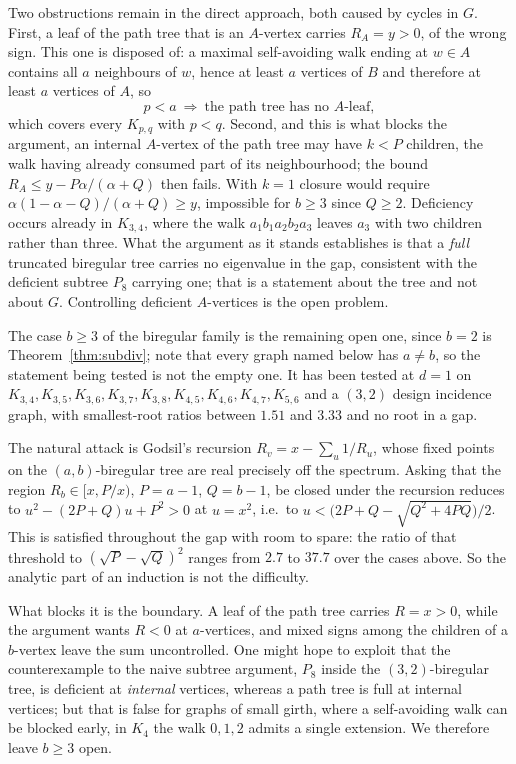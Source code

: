\documentclass[11pt]{article}
\theoremstyle{remark}
\begin{document}
Two obstructions remain in the direct approach, both caused by cycles in $G$. First, a leaf of the path
tree that is an $A$-vertex carries $R_A=y>0$, of the wrong sign. This one is
disposed of: a maximal self-avoiding walk ending at $w\in A$ contains all $a$
neighbours of $w$, hence at least $a$ vertices of $B$ and therefore at least $a$
vertices of $A$, so
\[
p<a\ \Longrightarrow\ \text{the path tree has no }A\text{-leaf},
\]
which covers every $K_{p,q}$ with $p<q$. Second, and this is what blocks the
argument, an internal $A$-vertex of the path tree may have $k<P$ children, the
walk having already consumed part of its neighbourhood; the bound
$R_A\le y-P\alpha/(\alpha+Q)$ then fails. With $k=1$ closure would require
$\alpha(1-\alpha-Q)/(\alpha+Q)\ge y$, impossible for $b\ge3$ since $Q\ge2$.
Deficiency occurs already in $K_{3,4}$, where the walk $a_1b_1a_2b_2a_3$ leaves
$a_3$ with two children rather than three. What the argument as it stands
establishes is that a \emph{full} truncated biregular tree carries no eigenvalue
in the gap, consistent with the deficient subtree $P_8$ carrying one; that is a
statement about the tree and not about $G$. Controlling deficient $A$-vertices
is the open problem.

The case $b\ge3$ of the biregular family is the remaining open one, since $b=2$
is Theorem~\ref{thm:subdiv}; note that every graph named below has $a\ne b$, so
the statement being tested is not the empty one. It has been tested at $d=1$ on
$K_{3,4},K_{3,5},K_{3,6},K_{3,7},K_{3,8},K_{4,5},K_{4,6},K_{4,7},K_{5,6}$ and a
$(3,2)$ design incidence graph, with smallest-root ratios between $1.51$ and
$3.33$ and no root in a gap.

The natural attack is Godsil's recursion $R_v=x-\sum_{u}1/R_u$, whose fixed
points on the $(a,b)$-biregular tree are real precisely off the spectrum. Asking
that the region $R_b\in[x,P/x)$, $P=a-1$, $Q=b-1$, be closed under the
recursion reduces to $u^2-(2P+Q)u+P^2>0$ at $u=x^2$, i.e.\ to
$u<\bigl(2P+Q-\sqrt{Q^2+4PQ}\bigr)/2$. This is satisfied throughout the gap
with room to spare: the ratio of that threshold to $(\sqrt P-\sqrt Q)^2$ ranges
from $2.7$ to $37.7$ over the cases above. So the analytic part of an induction
is not the difficulty.

What blocks it is the boundary. A leaf of the path tree carries $R=x>0$, while
the argument wants $R<0$ at $a$-vertices, and mixed signs among the children of
a $b$-vertex leave the sum uncontrolled. One might hope to exploit that the
counterexample to the naive subtree argument, $P_8$ inside the $(3,2)$-biregular
tree, is deficient at \emph{internal} vertices, whereas a path tree is full at
internal vertices; but that is false for graphs of small girth, where a
self-avoiding walk can be blocked early, in $K_4$ the walk $0,1,2$ admits a
single extension. We therefore leave $b\ge3$ open.
\end{document}
